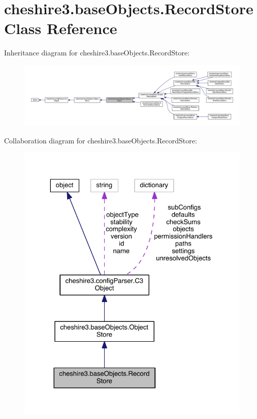 \hypertarget{classcheshire3_1_1base_objects_1_1_record_store}{\section{cheshire3.\-base\-Objects.\-Record\-Store Class Reference}
\label{classcheshire3_1_1base_objects_1_1_record_store}
}


Inheritance diagram for cheshire3.\-base\-Objects.\-Record\-Store\-:
\nopagebreak
\begin{figure}[H]
\begin{center}
\leavevmode
\includegraphics[width=350pt]{classcheshire3_1_1base_objects_1_1_record_store__inherit__graph}
\end{center}
\end{figure}


Collaboration diagram for cheshire3.\-base\-Objects.\-Record\-Store\-:
\nopagebreak
\begin{figure}[H]
\begin{center}
\leavevmode
\includegraphics[width=325pt]{classcheshire3_1_1base_objects_1_1_record_store__coll__graph}
\end{center}
\end{figure}
